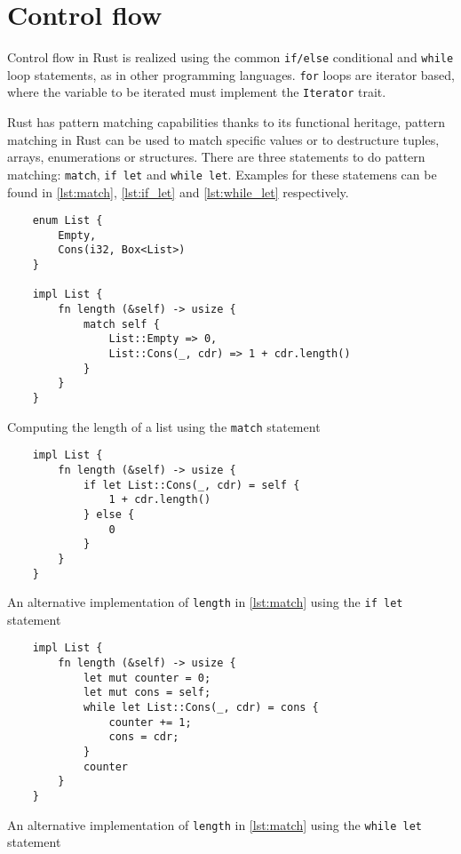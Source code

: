 \section{Control flow}
Control flow in Rust is realized using the common \texttt{if/else} conditional and \texttt{while} loop statements, as in other programming languages. \texttt{for} loops are iterator based, where the variable to be iterated must implement the \texttt{Iterator} trait.

Rust has pattern matching capabilities thanks to its functional heritage,
pattern matching in Rust can be used to match specific values or to destructure
tuples, arrays, enumerations or structures. There are three statements to do
pattern matching: \texttt{match}, \texttt{if let} and \texttt{while let}.
Examples for these statemens can be found in \ref{lst:match}, \ref{lst:if_let}
and \ref{lst:while_let} respectively.

\begin{listing}[ht]
	\begin{verbatim}
    enum List {
        Empty,
        Cons(i32, Box<List>)
    }

    impl List {
        fn length (&self) -> usize {
            match self {
                List::Empty => 0,
                List::Cons(_, cdr) => 1 + cdr.length()
            }
        } 
    }
    \end{verbatim}
    \caption{Computing the length of a list using the \texttt{match} statement}
  \label{lst:match}
\end{listing}

\begin{listing}[ht]
	\begin{verbatim}
    impl List {
        fn length (&self) -> usize {
            if let List::Cons(_, cdr) = self {
                1 + cdr.length()
            } else {
                0
            }
        } 
    }
    \end{verbatim}
    \caption{An alternative implementation of \texttt{length} in \ref{lst:match} using the \texttt{if let} statement}
  \label{lst:if_let}
\end{listing}

\begin{listing}[ht]
	\begin{verbatim}
    impl List {
        fn length (&self) -> usize {
            let mut counter = 0;
            let mut cons = self;
            while let List::Cons(_, cdr) = cons {
                counter += 1;
                cons = cdr;
            }
            counter
        } 
    }
    \end{verbatim}
    \caption{An alternative implementation of \texttt{length} in \ref{lst:match}
    using the \texttt{while let} statement}
  \label{lst:while_let}
\end{listing}


